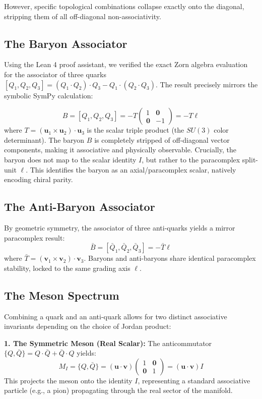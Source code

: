 However, specific topological combinations collapse exactly onto the diagonal, stripping them of all off-diagonal non-associativity.

\subsection{The Baryon Associator}
Using the Lean 4 proof assistant, we verified the exact Zorn algebra evaluation for the associator of three quarks $[Q_1, Q_2, Q_3] = (Q_1 \cdot Q_2) \cdot Q_3 - Q_1 \cdot (Q_2 \cdot Q_3)$. The result precisely mirrors the symbolic SymPy calculation:

\begin{equation}
B = [Q_1, Q_2, Q_3] = -T \begin{pmatrix} 1 & \mathbf{0} \\ \mathbf{0} & -1 \end{pmatrix} = -T \ell
\end{equation}
where $T = (\mathbf{u}_1 \times \mathbf{u}_2) \cdot \mathbf{u}_3$ is the scalar triple product (the $SU(3)$ color determinant). The baryon $B$ is completely stripped of off-diagonal vector components, making it associative and physically observable. Crucially, the baryon does not map to the scalar identity $I$, but rather to the paracomplex split-unit $\ell$. This identifies the baryon as an axial/paracomplex scalar, natively encoding chiral parity.

\subsection{The Anti-Baryon Associator}
By geometric symmetry, the associator of three anti-quarks yields a mirror paracomplex result:
\begin{equation}
\bar{B} = [\bar{Q}_1, \bar{Q}_2, \bar{Q}_3] = -\bar{T} \ell
\end{equation}
where $\bar{T} = (\mathbf{v}_1 \times \mathbf{v}_2) \cdot \mathbf{v}_3$. Baryons and anti-baryons share identical paracomplex stability, locked to the same grading axis $\ell$.

\subsection{The Meson Spectrum}
Combining a quark and an anti-quark allows for two distinct associative invariants depending on the choice of Jordan product:

\textbf{1. The Symmetric Meson (Real Scalar):}
The anticommutator $\{Q, \bar{Q}\} = Q \cdot \bar{Q} + \bar{Q} \cdot Q$ yields:
\begin{equation}
M_I = \{Q, \bar{Q}\} = (\mathbf{u} \cdot \mathbf{v}) \begin{pmatrix} 1 & \mathbf{0} \\ \mathbf{0} & 1 \end{pmatrix} = (\mathbf{u} \cdot \mathbf{v}) I
\end{equation}
This projects the meson onto the identity $I$, representing a standard associative particle (e.g., a pion) propagating through the real sector of the manifold.

